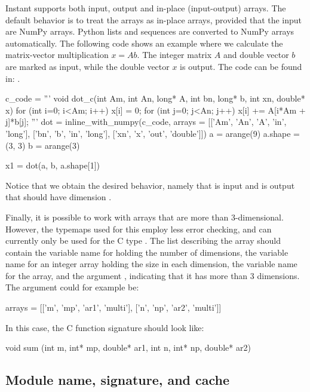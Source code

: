 Instant supports both input, output and in-place (input-output) arrays.
The default
behavior is to treat the arrays as in-place arrays, provided that the
input are NumPy arrays. Python lists and sequences are converted to
NumPy arrays automatically.  The following code shows an example where
we calculate the matrix-vector multiplication $x = Ab$. The integer
matrix $A$ and double vector $b$ are marked as input, while the double
vector $x$ is output. The code can be found in: .
\begin{python}
c_code = '''
void dot_c(int Am, int An, long* A, int bn, long* b, int xn, double* x)
{
    for (int i=0; i<Am; i++)
    {
        x[i] = 0;
        for (int j=0; j<An; j++)
        {
            x[i] += A[i*Am + j]*b[j];
        }
    }
}
'''
dot = inline_with_numpy(c_code,
                          arrays = [['Am', 'An', 'A', 'in', 'long'],
                                    ['bn', 'b', 'in', 'long'],
                                    ['xn', 'x', 'out', 'double']])
a = arange(9)
a.shape = (3, 3)
b = arange(3)

x1 = dot(a, b, a.shape[1])
\end{python}
Notice that we obtain the desired behavior, namely that  is
input and  is output that should have dimension .

Finally, it is possible to work with arrays that are more than
3-dimensional.  However, the typemaps used for this employ less error
checking, and can currently only be used for the C
type . The list describing the array should contain the
variable name for holding the number of dimensions, the variable name
for an integer array holding the size in each dimension, the variable
name for the array, and the argument , indicating that it
has more than 3 dimensions. The  argument could for
example be:
\begin{python}
arrays = [['m', 'mp', 'ar1', 'multi'],
          ['n', 'np', 'ar2', 'multi']]
\end{python}
In this case, the C function signature should look like:
\begin{c++}
void sum (int m, int* mp, double* ar1, int n,
          int* np, double* ar2)
\end{c++}

\subsection{Module name, signature, and cache}\label{wilbers:sec:msc}

